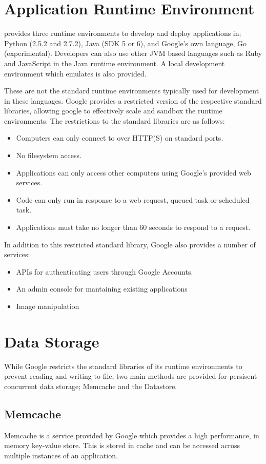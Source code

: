 \section{Application Runtime Environment}
\gae{} provides three runtime environments to develop and deploy applications in; Python (2.5.2 and 2.7.2), Java (SDK 5 or 6), and Google's own language, Go (experimental). Developers can also use other JVM based languages such as Ruby and JavaScript in the Java runtime environment. A local development environment which emulates \gae{} is also provided. 

These are not the standard runtime environments typically used for development in these languages. Google provides a restricted version of the respective standard libraries, allowing google to effectively scale and sandbox the runtime environments. The restrictions to the standard libraries are as follows:
\begin{itemize}
\item Computers can only connect to \gae{} over HTTP(S) on standard ports.
\item No filesystem access.
\item Applications can only access other computers using Google's provided web services.
\item Code can only run in response to a web request, queued task or scheduled task. 
\item Applications must take no longer than 60 seconds to respond to a request.
\end{itemize}

In addition to this restricted standard library, Google also provides a number of services:
\begin{itemize}
\item APIs for authenticating users through Google Accounts.
\item An admin console for mantaining existing applications
\item Image manipulation
\end{itemize}

\section{Data Storage}
While Google restricts the standard libraries of its runtime environments to prevent reading and writing to file, two main methods are provided for persisent concurrent data storage; Memcache and the Datastore.

\subsection{Memcache}
Memcache is a service provided by Google which provides a high performance, in memory key-value store. This is stored in cache and can be accessed across multiple instances of an application.

